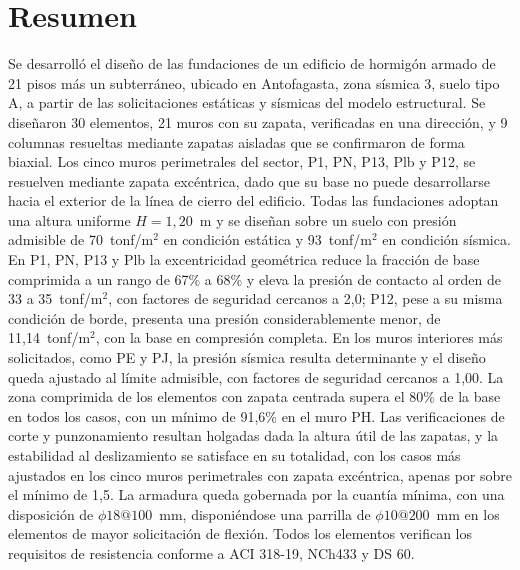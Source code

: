 \section*{Resumen}
Se desarrolló el diseño de las fundaciones de un edificio de hormigón armado de 21 pisos más un subterráneo, ubicado en Antofagasta, zona sísmica 3, suelo tipo A, a partir de las solicitaciones estáticas y sísmicas del modelo estructural. Se diseñaron 30 elementos, 21 muros con su zapata, verificadas en una dirección, y 9 columnas resueltas mediante zapatas aisladas que se confirmaron de forma biaxial. Los cinco muros perimetrales del sector, P1, PN, P13, Plb y P12, se resuelven mediante zapata excéntrica, dado que su base no puede desarrollarse hacia el exterior de la línea de cierro del edificio. Todas las fundaciones adoptan una altura uniforme $H = 1,20$~m y se diseñan sobre un suelo con presión admisible de 70~tonf/m$^2$ en condición estática y 93~tonf/m$^2$ en condición sísmica. En P1, PN, P13 y Plb la excentricidad geométrica reduce la fracción de base comprimida a un rango de 67\% a 68\% y eleva la presión de contacto al orden de 33 a 35~tonf/m$^2$, con factores de seguridad cercanos a 2,0; P12, pese a su misma condición de borde, presenta una presión considerablemente menor, de 11,14~tonf/m$^2$, con la base en compresión completa. En los muros interiores más solicitados, como PE y PJ, la presión sísmica resulta determinante y el diseño queda ajustado al límite admisible, con factores de seguridad cercanos a 1,00. La zona comprimida de los elementos con zapata centrada supera el 80\% de la base en todos los casos, con un mínimo de 91,6\% en el muro PH. Las verificaciones de corte y punzonamiento resultan holgadas dada la altura útil de las zapatas, y la estabilidad al deslizamiento se satisface en su totalidad, con los casos más ajustados en los cinco muros perimetrales con zapata excéntrica, apenas por sobre el mínimo de 1,5. La armadura queda gobernada por la cuantía mínima, con una disposición de $\phi 18 @ 100$~mm, disponiéndose una parrilla de $\phi 10 @ 200$~mm en los elementos de mayor solicitación de flexión. Todos los elementos verifican los requisitos de resistencia conforme a ACI 318-19, NCh433 y DS 60.